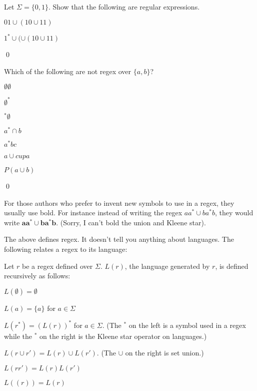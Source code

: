 \newpage
\begin{ex}
  Let $\Sigma = \{0,1\}$. Show that the following are regular expressions.
  \begin{tightlist}
    \item $0 1 \cup (1 0 \cup 1 1)$
    \item $1^* \cup (\cup (1 0 \cup 1 1)$
  \end{tightlist}
  \qed
\end{ex}


\newpage
\begin{ex} Which of the following are not regex over $\{a, b\}$?
\begin{tightlist}
\item $\emptyset \emptyset$
\item $\emptyset^*$
\item ${}^*\emptyset$
\item $a^* \cap b$
\item $a^* bc$
\item $a \cup cup a$  
\item $P(a \cup b)$
\end{tightlist}
\qed
\end{ex}


\newpage
For those authors who prefer to invent new symbols to use in a
regex, they usually use bold. For instance instead of writing the
regex $aa^* \cup ba^*b$, they would write $\mathbf{ aa^* \cup
ba^*b}$. (Sorry, I can't bold the union and Kleene star).


The above defines regex.
It doesn't tell you anything about languages.
The following relates a regex to its language:

\begin{defn}
 Let $r$ be a regex defined over $\Sigma$. 
 $L(r)$, the language generated by $r$, is defined recursively as follows:
 \begin{tightlist}
  \item $L(\emptyset) = \emptyset$
  \item $L(a) = \{a\}$ for $a \in \Sigma$
  \item $L(r^*) = (L(r))^*$ for $a \in \Sigma$. (The ${}^*$ on the left
        is a symbol used in a regex while the ${}^*$ on the right is the 
        Kleene star operator on languages.)
  \item $L(r \cup r') = L(r) \cup L(r')$. (The $\cup$ on the right is
        set union.)
  \item $L(rr') = L(r)L(r')$
  \item $L((r)) = L(r)$
 \end{tightlist}
\end{defn}

